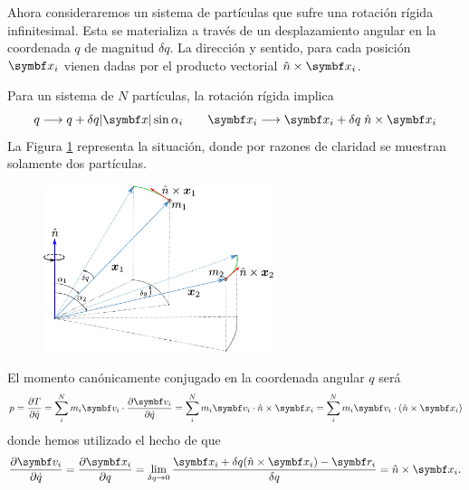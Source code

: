 \documentclass[10pt,oneside]{CBFT_book}
\begin{document}
Ahora consideraremos un sistema de partículas que sufre una rotación rígida infinitesimal.
Esta se materializa a través de un desplazamiento angular en la coordenada $ q $ de magnitud $\delta q$.
La dirección y sentido, para cada posición $ \vb{x}_i $ vienen dadas por el producto vectorial 
$ \hat{n} \times \vb{x}_i$.

Para un sistema de $ N $ partículas, la rotación rígida implica
\[
	q \longrightarrow q + \delta q |\vb{x}| \sin \alpha_i \qquad
	\vb{x}_i \longrightarrow \vb{x}_i + \delta q \; \hat{n} \times \vb{x}_i
\]
La Figura \ref{rotacion_rigida} representa la situación, donde por razones de claridad se muestran
solamente dos partículas.

\begin{figure}[htb]
	\begin{center}
	\includegraphics[width=0.6\textwidth]{images/fig_mc_rot_rig.pdf}	 
	\end{center}
	\caption{}
	\label{rotacion_rigida}
\end{figure} 
El momento canónicamente conjugado en la coordenada angular $q$ será
\[
	p = \dpar{T}{\dot{q}} = 
	\sum_i^N m_i \vb{v}_i \cdot \dpar{\vb{v}_i}{\dot{q}} =
	\sum_i^N m_i \vb{v}_i \cdot \hat{n} \times \vb{x}_i = 
	\sum_i^N m_i \vb{v}_i \cdot ( \hat{n} \times \vb{x}_i )
\]
donde hemos utilizado el hecho de que 
\[
	\dpar{\vb{v}_i}{\dot{q}} = \dpar{\vb{x}_i}{q} = 
	\lim_{\delta q \to 0} \frac{ \vb{x}_i +\delta q (\hat{n} \times \vb{x}_i)- 
	\vb{r}_i}{\delta q} = \hat{n} \times \vb{x}_i. 
\]
\end{document}
